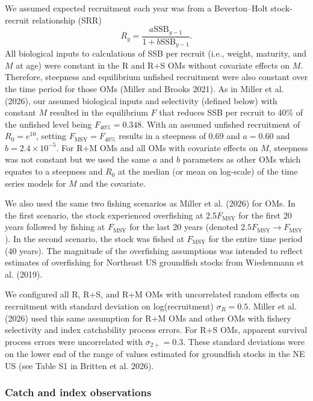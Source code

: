 \documentclass[
  12pt,
]{article}
\newcommand{\Fmsy}{\ensuremath{F_{\text{MSY}}}\xspace}
\begin{document}
We assumed expected recruitment each year was from a Beverton--Holt
stock-recruit relationship (SRR) \[
R_{y} = \frac{a \text{SSB}_{y-1}}{1 + b \text{SSB}_{y-1}}.
\] All biological inputs to calculations of SSB per recruit (i.e.,
weight, maturity, and \(M\) at age) were constant in the R and R+S OMs
without covariate effects on \(M\). Therefore, steepness and equilibrium
unfished recruitment were also constant over the time period for those
OMs (Miller and Brooks 2021). As in Miller et al. (2026), our assumed
biological inputs and selectivity (defined below) with constant \(M\)
resulted in the equilibrium \(F\) that reduces SSB per recruit to 40\%
of the unfished level being \(F_{40\%} = 0.348\). With an assumed
unfished recruitment of \(R_0 = e^{10}\), setting \(\Fmsy = F_{40\%}\)
results in a steepness of 0.69 and \(a=0.60\) and
\(b = 2.4 \times 10^{-5}\). For R+M OMs and all OMs with covariate
effects on \(M\), steepness was not constant but we used the same \(a\)
and \(b\) parameters as other OMs which equates to a steepness and
\(R_0\) at the median (or mean on log-scale) of the time series models
for \(M\) and the covariate.

We also used the same two fishing scenarios as Miller et al. (2026) for
OMs. In the first scenario, the stock experienced overfishing at
2.5\Fmsy for the first 20 years followed by fishing at \Fmsy for the
last 20 years (denoted \(2.5\Fmsy \rightarrow \Fmsy\)). In the second
scenario, the stock was fished at \Fmsy for the entire time period (40
years). The magnitude of the overfishing assumptions was intended to
reflect estimates of overfishing for Northeast US groundfish stocks from
Wiedenmann et al. (2019).

We configured all R, R+S, and R+M OMs with uncorrelated random effects
on recruitment with standard deviation on log(recruitment)
\(\sigma_R = 0.5\). Miller et al. (2026) used this same assumption for
R+M OMs and other OMs with fishery selectivity and index catchability
process errors. For R+S OMs, apparent survival process errors were
uncorrelated with \(\sigma_{2+} = 0.3\). These standard deviations were
on the lower end of the range of values estimated for groundfish stocks
in the NE US (see Table S1 in Britten et al. 2026).

\subsubsection*{Catch and index
observations}\label{catch-and-index-observations}
\end{document}
